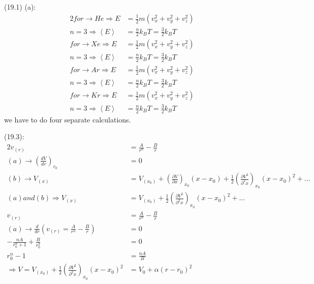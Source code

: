 \begin{latin}
    \section*{}
    (19.1) (a):\
    \begin{alignat*}{2}
        for \to He \Longrightarrow E &= \frac{1}{2} m(v_x ^2 + v_y ^2 + v_z ^2)\\
        n = 3 \Longrightarrow \left \langle E \right \rangle &= \frac{n}{2}k_B T = \frac{3}{2}k_B T\\
        for \to Xe \Longrightarrow E &= \frac{1}{2} m(v_x ^2 + v_y ^2 + v_z ^2)\\
        n = 3 \Longrightarrow \left \langle E \right \rangle &= \frac{n}{2}k_B T = \frac{3}{2}k_B T\\
        for \to Ar \Longrightarrow E &= \frac{1}{2} m(v_x ^2 + v_y ^2 + v_z ^2)\\
        n = 3 \Longrightarrow \left \langle E \right \rangle &= \frac{n}{2}k_B T = \frac{3}{2}k_B T\\
        for \to Kr \Longrightarrow E &= \frac{1}{2} m(v_x ^2 + v_y ^2 + v_z ^2)\\
        n = 3 \Longrightarrow \left \langle E \right \rangle &= \frac{n}{2}k_B T = \frac{3}{2}k_B T
    \end{alignat*}
    we have to do four separate calculations.\\
    \begin{latin}
        (19.3):
        \begin{alignat*}{2}
            v_{(r)} &= \frac{A}{r^n} - \frac{B}{r}\\
            (a) \to (\frac{dV}{dr})_{r_0} &=0\\
            (b) \to V_{(x)}&= V_{(x_0)} + (\frac{\partial V}{\partial x})_{x_0} (x-x_0) + \frac{1}{2}(\frac{\partial V^2}{\partial^2 x})_{x_0} (x-x_0)^2 + \dots \\
            (a) and (b) \Longrightarrow V_{(x)}&= V_{(x_0)} + \frac{1}{2}(\frac{\partial V^2}{\partial^2 x})_{x_0} (x-x_0)^2  +\dots\\
            v_{(r)} &= \frac{A}{r^n} - \frac{B}{r}\\
            (a)\to \frac{d}{dr}(v_{(r)} = \frac{A}{r^n} - \frac{B}{r}) &= 0\\
            -\frac{nA}{r_0 ^n+1}+ \frac{B}{r_0 ^2} &=0\\
            r_0 ^n-1 &=\frac{nA}{B} \\
            \Longrightarrow V = V_{(x_0)} + \frac{1}{2}(\frac{\partial V^2}{\partial^2 x})_{x_0} (x-x_0)^2  &= V_0 + \alpha (r-r_0)^2\\

\end{alignat*}
\end{latin}
\end{latin}
